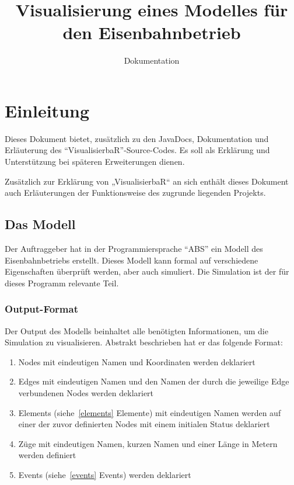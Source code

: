 \documentclass[accentcolor=tud0b,12pt,paper=a4]{tudreport}
\title{Visualisierung eines Modelles für den Eisenbahnbetrieb}
\subtitle{Dokumentation} %
\begin{document}
	\maketitle
	\tableofcontents
	
	\chapter{Einleitung}
		Dieses Dokument bietet, zusätzlich zu den JavaDocs, Dokumentation und Erläuterung des "`VisualisierbaR"'-Source-Codes. Es soll als Erklärung und Unterstützung bei späteren Erweiterungen dienen.
		
		Zusätzlich zur Erklärung von „VisualisierbaR“ an sich enthält dieses Dokument auch Erläuterungen der Funktionsweise des zugrunde liegenden Projekts.
		
	\section{Das Modell}
		Der Auftraggeber hat in der Programmiersprache "`ABS"' ein Modell des Eisenbahnbetriebs erstellt. Dieses Modell kann formal auf verschiedene Eigenschaften überprüft werden, aber auch simuliert. Die Simulation ist der für dieses Programm relevante Teil.
		
		\subsection{Output-Format}
			Der Output des Modells beinhaltet alle benötigten Informationen, um die Simulation zu visualisieren. Abstrakt beschrieben hat er das folgende Format:\\
			
			\begin{enumerate}
				\item Nodes mit eindeutigen Namen und Koordinaten werden deklariert
				\item Edges mit eindeutigen Namen und den Namen der durch die jeweilige Edge verbundenen Nodes werden deklariert
				\item Elements (siehe~\ref{elements} Elemente) mit eindeutigen Namen werden auf einer der zuvor definierten Nodes mit einem initialen Status deklariert
				\item Züge mit eindeutigen Namen, kurzen Namen und einer Länge in Metern werden definiert
				\item Events (siehe~\ref{events} Events) werden deklariert
			\end{enumerate}
		
\end{document}
